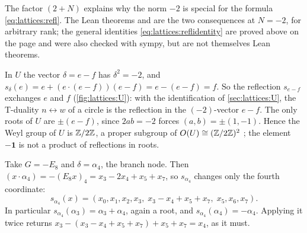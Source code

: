 The factor $(2+N)$ explains why the norm $-2$ is special for the formula
\eqref{eq:lattices:refl}. The Lean theorems  and
 are the two consequences at $N=-2$, for arbitrary rank; the
general identities \eqref{eq:lattices:reflidentity} are proved above on the page and were
also checked with sympy, but are not themselves Lean theorems.

\begin{example}\label{ex:lattices:Treflection}
In $U$ the vector $\delta=e-f$ has $\delta^2=-2$, and
$s_\delta(e)=e+(e\cdot(e-f))(e-f)=e-(e-f)=f$. So the reflection $s_{e-f}$ exchanges $e$ and
$f$ (\cref{fig:lattices:U}): with the identification of \cref{sec:lattices:U}, the T-duality
$n\leftrightarrow w$ of a circle is the reflection in the $(-2)$-vector $e-f$. The only roots
of $U$ are $\pm(e-f)$, since $2ab=-2$ forces $(a,b)=\pm(1,-1)$. Hence the Weyl group of $U$
is $\mathbb{Z}/2\mathbb{Z}$, a proper subgroup of $O(U)\cong(\mathbb{Z}/2\mathbb{Z})^2$ ; the
element $-\mathbf1$ is not a product of reflections in roots.
\end{example}

\begin{example}\label{ex:lattices:simplerefl}
Take $G=-E_8$ and $\delta=\alpha_4$, the branch node. Then $(x\cdot\alpha_4)=-(E_8x)_4
=x_3-2x_4+x_5+x_7$, so $s_{\alpha_4}$ changes only the fourth coordinate:
\[
 s_{\alpha_4}(x)=(x_0,x_1,x_2,x_3,\;x_3-x_4+x_5+x_7,\;x_5,x_6,x_7) .
\]
In particular $s_{\alpha_4}(\alpha_3)=\alpha_3+\alpha_4$, again a root, and
$s_{\alpha_4}(\alpha_4)=-\alpha_4$. Applying it twice returns $x_3-(x_3-x_4+x_5+x_7)+x_5+x_7
=x_4$, as it must.
\end{example}

